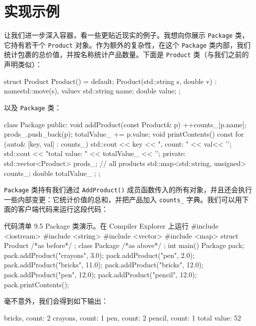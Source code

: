 \section{实现示例}

让我们进一步深入容器，看一些更贴近现实的例子。我想向你展示 \texttt{Package} 类，它持有若干个 \texttt{Product} 对象。作为额外的复杂性，在这个 \texttt{Package} 类内部，我们统计包裹的总价值，并按名称统计产品数量。下面是 \texttt{Product} 类（与我们之前的声明类似）：

\begin{codebox}[cpp]
struct Product {
    Product() = default;
    Product(std::string s, double v)
    : name{std::move(s)}, value{v}
    { }
    std::string name;
    double value{};
};
\end{codebox}

以及 \texttt{Package} 类：

\begin{codebox}[cpp]
class Package {
public:
    void addProduct(const Product& p) {
        ++counts_[p.name];
        prods_.push_back(p);
        totalValue_ += p.value;
    }
    void printContents() const {
        for (auto& [key, val] : counts_)
            std::cout << key << ", count: " << val<< '\n';
        std::cout << "total value: " << totalValue_ << '\n';
    }
private:
    std::vector<Product> prods_; // all products
    std::map<std::string, unsigned> counts_;
    double totalValue_ { };
};
\end{codebox}

\texttt{Package} 类持有我们通过 \texttt{AddProduct()} 成员函数传入的所有对象，并且还会执行一些内部变更：它统计价值的总和，并把产品加入 \texttt{counts\_} 字典。我们可以用下面的客户端代码来运行这段代码：

\begin{codeboxt}[cpp]{代码清单 9.5 Package 类演示。在 Compiler Explorer 上运行}
#include <iostream>
#include <string>
#include <vector>
#include <map>
struct Product { /*as before*/ };
class Package { /*as above*/ };
int main() {
    Package pack;
    pack.addProduct({"crayons", 3.0});
    pack.addProduct({"pen", 2.0});
    pack.addProduct({"bricks", 11.0});
    pack.addProduct({"bricks", 12.0});
    pack.addProduct({"pen", 12.0});
    pack.addProduct({"pencil", 12.0});
    pack.printContents();
}
\end{codeboxt}

毫不意外，我们会得到如下输出：

\begin{codebox}[cpp]
bricks, count: 2
crayons, count: 1
pen, count: 2
pencil, count: 1
total value: 52
\end{codebox}

